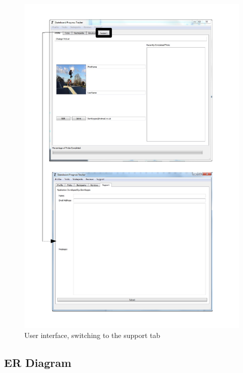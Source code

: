 \begin{figure}[H]
    \includegraphics[width=\textwidth]{./Maintenance/Figures/SupportTab.pdf}
    \caption{User interface, switching to the support tab} \label{fig:Support Tab UI}
\end{figure}











\subsection{ER Diagram}

